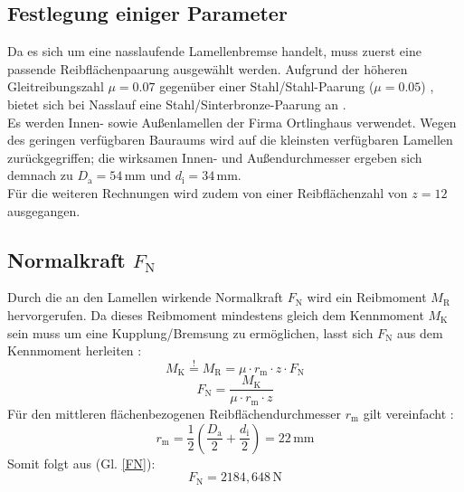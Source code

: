 \subsection{Festlegung einiger Parameter}
Da es sich um eine nasslaufende Lamellenbremse handelt, muss zuerst eine passende Reibflächenpaarung ausgewählt werden. Aufgrund der höheren Gleitreibungszahl $\mu= 0.07$ gegenüber einer Stahl/Stahl-Paarung ($\mu = 0.05$) \cite[Tab. 1]{VDI2241-1}, bietet sich bei Nasslauf eine Stahl/Sinterbronze-Paarung an \cite[Tab. 1]{VDI2241-2}. \\
Es werden Innen- sowie Außenlamellen der Firma Ortlinghaus verwendet. Wegen des geringen verfügbaren Bauraums wird auf die kleinsten verfügbaren Lamellen zurückgegriffen; die wirksamen Innen- und Außendurchmesser ergeben sich demnach zu $D_\mathrm{a} = 54\,\mathrm{mm}$ und $d_\mathrm{i} = 34\,\mathrm{mm}$. \\
Für die weiteren Rechnungen wird zudem von einer Reibflächenzahl von $z = 12$ ausgegangen. 

\subsection{Normalkraft $F_\mathrm{N}$}
Durch die an den Lamellen wirkende Normalkraft $F_\mathrm{N}$ wird ein Reibmoment $M_\mathrm{R}$ hervorgerufen. Da dieses Reibmoment mindestens gleich dem Kennmoment $M_\mathrm{K}$ sein muss um eine Kupplung/Bremsung zu ermöglichen, lasst sich $F_\mathrm{N}$ aus dem Kennmoment herleiten \cite[S. 325, Gl. 5.42]{Sauer}:
\begin{equation}
    M_\mathrm{K} \stackrel{!}{=} M_\mathrm{R} = \mu \cdot r_\mathrm{m} \cdot z \cdot F_\mathrm{N}
\end{equation}
\begin{equation} \label{FN}
    F_\mathrm{N} = \frac{M_\mathrm{K}}{\mu \cdot r_\mathrm{m} \cdot z}
\end{equation}
Für den mittleren flächenbezogenen Reibflächendurchmesser $r_\mathrm{m}$ gilt vereinfacht \cite[S. 324]{Sauer}:
\begin{equation}
    r_\mathrm{m} = \frac{1}{2} \left( \frac{D_\mathrm{a}}{2} + \frac{d_\mathrm{i}}{2} \right) = 22\,\mathrm{mm}
\end{equation}
Somit folgt aus (Gl. \ref{FN}): 
\begin{equation}
    F_\mathrm{N} = 2184,648\,\mathrm{N}
\end{equation}


